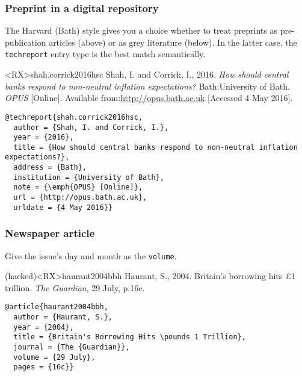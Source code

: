 \documentclass[10pt,a4paper]{article}
\newenvironment{tips}{%
  \begin{list}{\makebox[2em][c]{\faLightbulbO}}{%
    \setlength{\leftmargin}{2em}
    \setlength{\labelwidth}{2em}
    \setlength{\labelsep}{0pt}}
}{\end{list}}
\newenvironment{hacks}{%
  \begin{list}{\makebox[2em][c]{\faWrench}}{%
    \setlength{\leftmargin}{2em}
    \setlength{\labelwidth}{2em}
    \setlength{\labelsep}{0pt}}
}{\end{list}}
\begin{document}
\subsubsection*{Preprint in a digital repository}

\begin{tips}
\item
The Harvard (Bath) style gives you a choice whether to treat preprints as
pre-publication articles (above) or as grey literature (below). In the latter
case, the \texttt{techreport} entry type is the best match semantically.
\end{tips}

\begin{bibexbox}<RX>{shah.corrick2016hsc}
  Shah, I. and Corrick, I., 2016. \emph{How should central banks respond to non-neutral inflation expectations?} Bath:\@ University of Bath. \emph{OPUS} [Online]. Available from:\@ \url{http://opus.bath.ac.uk} [Accessed 4 May 2016].
  \tcblower
\begin{Verbatim}
@techreport{shah.corrick2016hsc,
  author = {Shah, I. and Corrick, I.},
  year = {2016},
  title = {How should central banks respond to non-neutral inflation expectations?},
  address = {Bath},
  institution = {University of Bath},
  note = {\emph{OPUS} [Online]},
  url = {http://opus.bath.ac.uk},
  urldate = {4 May 2016}}
\end{Verbatim}
\end{bibexbox}

\subsubsection*{Newspaper article}

\begin{hacks}\item Give the issue's day and month as the \texttt{volume}.\end{hacks}

\begin{bibexbox}(hacked)<RX>{haurant2004bbh}
  Haurant, S., 2004. Britain's borrowing hits £1 trillion. \emph{The Guardian}, 29 July, p.16c.
  \tcblower
\begin{Verbatim}
@article{haurant2004bbh,
  author = {Haurant, S.},
  year = {2004},
  title = {Britain's Borrowing Hits \pounds 1 Trillion},
  journal = {The {Guardian}},
  volume = {29 July},
  pages = {16c}}
\end{Verbatim}
\end{bibexbox}
\end{document}
